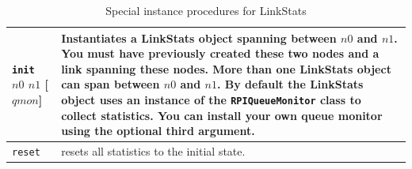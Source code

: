 \documentclass[11pt]{article}
\begin{document}
\begin{table}[ht]
\begin{center}
\begin{tabular}{|l|l|}\hline
\verb|init| $n0$ $n1$ [$qmon$] &
  \begin{minipage}[c]{4in}
  \vspace{0.05in}
  Instantiates a LinkStats object spanning between $n0$ and $n1$.
  You must have previously created these two nodes and a link
  spanning these nodes.  More than one LinkStats object can
  span between $n0$ and $n1$.  By default the LinkStats object
  uses an instance of the \verb|RPIQueueMonitor| class to
  collect statistics.  You can install your own queue monitor
  using the optional third argument.
  \vspace{0.05in}
  \end{minipage} \\ \hline
  
\verb|reset|  &
  \begin{minipage}[c]{4in}
  \vspace{0.05in}
  resets all statistics to the initial state.
  \vspace{0.05in}
  \end{minipage} \\ \hline
  
\end{tabular}
\end{center}
\caption{Special instance procedures for LinkStats}
\end{table}
\end{document}
